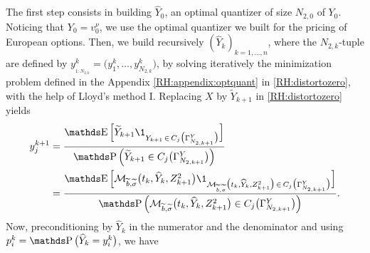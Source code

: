 \medskip
The first step consists in building $\widehat Y_0$, an optimal quantizer of size $N_{2,0}$ of $Y_0$. Noticing that $Y_0 = v_0^{\nu}$, we use the optimal quantizer we built for the pricing of European options. Then, we build recursively $(\widehat Y_k)_{k=1, \dots, n}$, where the $N_{2,k}$-tuple are defined by $y_{_{1:N_{2,k}}}^k = \big( y_1^k, \dots, y_{N_{2,k}}^k \big)$, by solving iteratively the minimization problem defined in the Appendix \ref{RH:appendix:optquant} in \eqref{RH:distortozero}, with the help of Lloyd's method I. Replacing $X$ by $\widetilde Y_{k+1}$ in \eqref{RH:distortozero} yields
\begin{equation}
	\begin{aligned}
		y_j^{k+1}
		 & = \frac{ \E \Big[ \widetilde Y_{k+1} \1_{ Y_{k+1} \, \in \, C_j \big( \Gamma_{N_{2,k+1}}^Y \big) } \Big] }{\Prob \Big( \widetilde Y_{k+1} \in C_j \big( \Gamma_{N_{2,k+1}}^Y \big) \Big) }                                                                                                                                                                                                                          \\
		 & = \frac{ \E \Big[ \mathcal{M}_{\widetilde b, \widetilde \sigma} \big( t_k, \widehat Y_k, Z_{k+1}^2 \big) \1_{ \mathcal{M}_{\widetilde b, \widetilde \sigma} \big( t_k, \widehat Y_k, Z_{k+1}^2 \big) \, \in \, C_j \big( \Gamma_{N_{2,k+1}}^Y \big) } \Big] }{ \Prob \Big( \mathcal{M}_{\widetilde b, \widetilde \sigma} \big( t_k, \widehat Y_k, Z_{k+1}^2 \big) \in C_j \big( \Gamma_{N_{2,k+1}}^Y \big) \Big) }.
	\end{aligned}
\end{equation}
Now, preconditioning by $\widehat Y_k$ in the numerator and the denominator and using $p_i^k = \Prob \big( \widehat Y_k = y_i^k \big)$, we have
